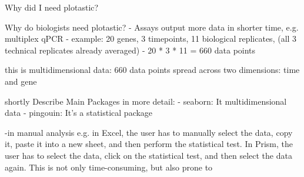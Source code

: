 











Why did I need plotastic?


Why do biologists need plotastic?
- Assays output more data in shorter time, e.g. multiplex qPCR
- example: 20 genes, 3 timepoints, 11 biological replicates, (all 3
technical replicates already averaged)
- 20 * 3 * 11 = 660 data points

this is multidimensional data:  660 data points spread across two dimensions: time
and gene

shortly Describe Main Packages in more detail:
- seaborn: It multidimensional data
- pingouin: It's a statistical package

-in manual analysis e.g. in Excel, the user has to manually select the
data, copy it, paste it into a new sheet, and then perform the
statistical test. In Prism, the user has to select the data, click on
the statistical test, and then select the data again. This is not only
time-consuming, but also prone to





